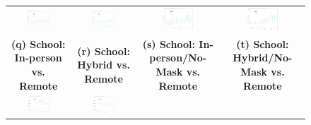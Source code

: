 \documentclass[9pt,twocolumn,twoside,lineno]{pnas-new}
\begin{document}
\begin{figure}[!ht]
{\begin{minipage}{\linewidth}
\begin{tabular}{cccc}
 \includegraphics[width=0.4\textwidth]{event_logdeaths_csfull.pdf}& \includegraphics[width=0.4\textwidth]{event_logdeaths_cshybrid.pdf} & \includegraphics[width=0.4\textwidth]{event_logdeaths_csfullno.pdf}& \includegraphics[width=0.4\textwidth]{event_logdeaths_cshybridno.pdf}\smallskip\\
\textbf{\large (q) School: In-person vs. Remote }&\textbf{\large (r) School:  Hybrid vs. Remote }&\textbf{\large (s) School: In-person/No-Mask vs. Remote}&\textbf{\large (t) School:  Hybrid/No-Mask vs. Remote }\smallskip\\
 \includegraphics[width=0.4\textwidth]{event_school_csfull.pdf}& \includegraphics[width=0.4\textwidth]{event_school_cshybrid.pdf}

\end{tabular}
\end{minipage}}
\end{figure}
\end{document}
